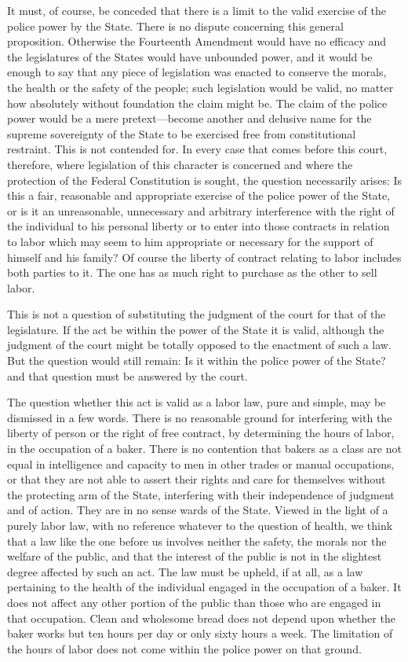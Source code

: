 \documentclass[
  letterpaper,
  11pt,
  DIV=9,
  openright]{scrbook}
\begin{document}
It must, of course, be conceded that there is a limit to the valid
exercise of the police power by the State. There is no dispute
concerning this general proposition. Otherwise the Fourteenth Amendment
would have no efficacy and the legislatures of the States would have
unbounded power, and it would be enough to say that any piece of
legislation was enacted to conserve the morals, the health or the safety
of the people; such legislation would be valid, no matter how absolutely
without foundation the claim might be. The claim of the police power
would be a mere pretext---become another and delusive name for the
supreme sovereignty of the State to be exercised free from
constitutional restraint. This is not contended for. In every case that
comes before this court, therefore, where legislation of this character
is concerned and where the protection of the Federal Constitution is
sought, the question necessarily arises: Is this a fair, reasonable and
appropriate exercise of the police power of the State, or is it an
unreasonable, unnecessary and arbitrary interference with the right of
the individual to his personal liberty or to enter into those contracts
in relation to labor which may seem to him appropriate or necessary for
the support of himself and his family? Of course the liberty of contract
relating to labor includes both parties to it. The one has as much right
to purchase as the other to sell labor.

This is not a question of substituting the judgment of the court for
that of the legislature. If the act be within the power of the State it
is valid, although the judgment of the court might be totally opposed to
the enactment of such a law. But the question would still remain: Is it
within the police power of the State? and that question must be answered
by the court.

The question whether this act is valid as a labor law, pure and simple,
may be dismissed in a few words. There is no reasonable ground for
interfering with the liberty of person or the right of free contract, by
determining the hours of labor, in the occupation of a baker. There is
no contention that bakers as a class are not equal in intelligence and
capacity to men in other trades or manual occupations, or that they are
not able to assert their rights and care for themselves without the
protecting arm of the State, interfering with their independence of
judgment and of action. They are in no sense wards of the State. Viewed
in the light of a purely labor law, with no reference whatever to the
question of health, we think that a law like the one before us involves
neither the safety, the morals nor the welfare of the public, and that
the interest of the public is not in the slightest degree affected by
such an act. The law must be upheld, if at all, as a law pertaining to
the health of the individual engaged in the occupation of a baker. It
does not affect any other portion of the public than those who are
engaged in that occupation. Clean and wholesome bread does not depend
upon whether the baker works but ten hours per day or only sixty hours a
week. The limitation of the hours of labor does not come within the
police power on that ground.
\end{document}
